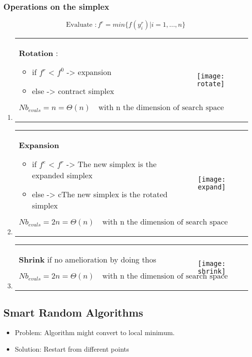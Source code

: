 \subsubsection{Operations on the simplex}
$$\textrm{Evaluate }: f^r = min \{ f(y_i^r) | i=1,...,n\}$$
\begin{enumerate}
    \item \begin{tabular}{m{11cm}m{3cm}}
            \textbf{Rotation } :\begin{itemize}
                \item if $f^r$ < $f^0$ -> expansion
\item else -> contract simplex 
    \end{itemize}

            $$Nb_{evals} = n = \Theta(n) \quad \textrm{with n the
            dimension of search space}$$ 
            & 
            \texttt{[image: rotate]}
        \end{tabular}

    \item \begin{tabular}{m{11cm}m{3cm}}
            \textbf{Expansion } 
            \begin{itemize}
\item if $f^e$ < $f^r$ -> The new simplex is the expanded simplex
\item else -> cThe new simplex is the rotated simplex 
    \end{itemize}

            $$Nb_{evals} = 2n = \Theta(n) \quad \textrm{with n the
            dimension of search space}$$ 
            & 
            \texttt{[image: expand]}
        \end{tabular}

    \item \begin{tabular}{m{11cm}m{3cm}}
            \textbf{Shrink} if no amelioration by doing thos 

            $$Nb_{evals} = 2n = \Theta(n) \quad \textrm{with n the
            dimension of search space}$$ 
            & 
            \texttt{[image: shrink]}
        \end{tabular}
\end{enumerate}



\subsection{Smart Random Algorithms}
\begin{itemize}
    \item Problem: Algorithm might convert to local minimum.
    \item Solution:  Restart from different points
\end{itemize}

